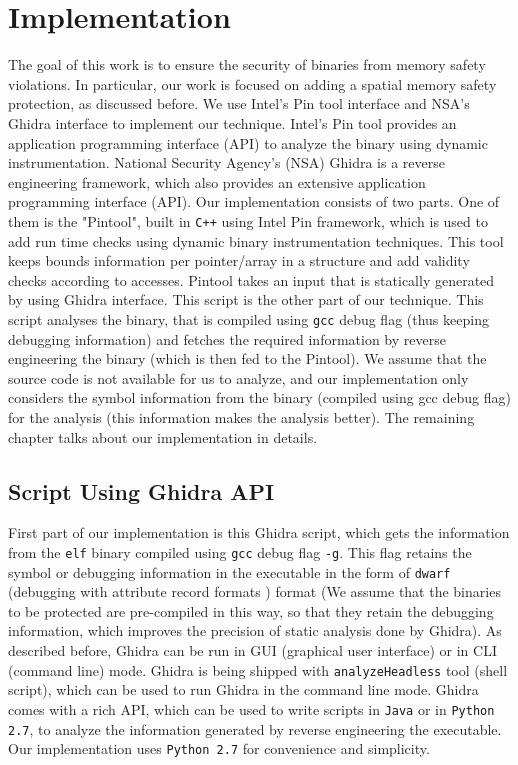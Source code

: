 
\chapter{Implementation}

The goal of this work is to ensure the security of binaries from memory safety violations. In particular, our work is focused on adding a spatial memory safety protection, as discussed before. We use Intel's Pin tool interface and NSA's Ghidra interface to implement our technique. Intel's Pin tool provides an application programming interface (API) to analyze the binary using dynamic instrumentation. National Security Agency's (NSA) Ghidra is a reverse engineering framework, which also provides an extensive application programming interface (API). Our implementation consists of two parts. One of them is the "Pintool", built in \texttt{C++} using Intel Pin framework, which is used to add run time checks using dynamic binary instrumentation techniques. This tool keeps bounds information per pointer/array in a structure and add validity checks according to accesses. Pintool takes an input that is statically generated by using Ghidra interface. This script is the other part of our technique. This script analyses the binary, that is compiled using \texttt{gcc} debug flag (thus keeping debugging information) and fetches the required information by reverse engineering the binary (which is then fed to the Pintool). We assume that the source code is not available for us to analyze, and our implementation only considers the symbol information from the binary (compiled using gcc debug flag) for the analysis (this information makes the analysis better). The remaining chapter talks about our implementation in details.

\section{Script Using Ghidra API}
First part of our implementation is this Ghidra script, which gets the information from the \texttt{elf} binary compiled using \texttt{gcc} debug flag \texttt{-g}. This flag retains the symbol or debugging information in the executable in the form of \texttt{dwarf} (debugging with attribute record formats \citep{eager2007introduction}) format (We assume that the binaries to be protected are pre-compiled in this way, so that they retain the debugging information, which improves the precision of static analysis done by Ghidra). As described before, Ghidra can be run in GUI (graphical user interface) or in CLI (command line) mode. Ghidra is being shipped with \texttt{analyzeHeadless} tool (shell script), which can be used to run Ghidra in the command line mode. Ghidra comes with a rich API, which can be used to write scripts in \texttt{Java} or in \texttt{Python 2.7}, to analyze the information generated by reverse engineering the executable. Our implementation uses \texttt{Python 2.7} for convenience and simplicity.

